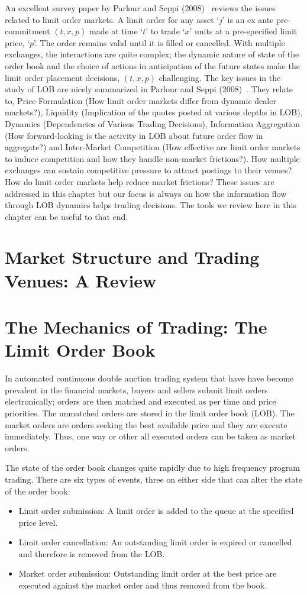 An excellent survey paper by Parlour and Seppi (2008)~\cite{parseppi} reviews the issues related to limit order markets. A limit order for any asset `$j$' is an  ex ante pre-commitment $(t,x,p)$ made at time `$t$' to trade `$x$' units at a pre-specified limit price, `$p$'. The order remains valid until it is filled or cancelled. With multiple exchanges, the interactions are quite complex; the dynamic nature of state of the order book and the choice of actions in anticipation of the future states make the limit order placement decisions, $(t,x,p)$ challenging. The key issues in the study of LOB are nicely summarized in Parlour and Seppi (2008)~\cite{parseppi}. They relate to, Price Formulation (How limit order markets differ from dynamic dealer markets?), Liquidity (Implication of the quotes posted at various depths in LOB), Dynamics (Dependencies of Various Trading Decisions), Information Aggregation (How forward-looking is the activity in LOB about future order flow in aggregate?) and Inter-Market Competition (How effective are limit order markets to induce competition and how they handle non-market frictions?). How multiple exchanges can sustain competitive pressure to attract postings to their venues? How do limit order markets help reduce market frictions? These issues are addressed in this chapter but our focus is always on how the information flow through LOB dynamics helps trading decisions. The tools we review here in this chapter can be useful to that end. 


\section{Market Structure and Trading Venues: A Review}
\section{The Mechanics of Trading: The Limit Order Book}

In automated continuous double auction trading system that have have become prevalent in the financial markets, buyers and sellers submit limit orders electronically; orders are then matched and executed as per time and price priorities. The unmatched orders are stored in the limit order book (LOB). The market orders are orders seeking the best available price and they are execute immediately. Thus, one way or other all executed orders can be taken as market orders.


The state of the order book changes quite rapidly due to high frequency program trading. There are six types of events, three on either side that can alter the state of the order book:
	\begin{itemize}
	\item Limit order submission: A limit order is added to the queue at the specified price level.
	\item Limit order cancellation: An outstanding limit order is expired or cancelled and therefore is removed from the LOB.
	\item Market order submission: Outstanding limit order at the best price are executed against the market order and thus removed from the book.
	\end{itemize}


